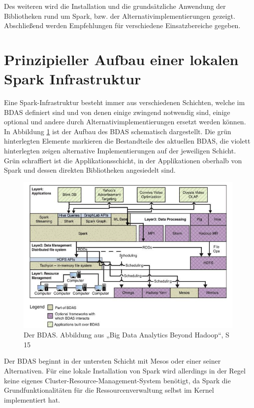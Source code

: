 Des weiteren wird die Installation und die grundsätzliche Anwendung der Bibliotheken rund um Spark, bzw. der Alternativimplementierungen gezeigt. Abschließend werden Empfehlungen für verschiedene Einsatzbereiche gegeben. 

\section{Prinzipieller Aufbau einer lokalen Spark Infrastruktur}
\label{section:prinzipiell}

Eine Spark-Infrastruktur besteht immer aus verschiedenen Schichten, welche im BDAS definiert sind und von denen einige zwingend notwendig sind, einige optional und andere durch Alternativimplementierungen ersetzt werden können.  
In Abbildung \ref{fig:bdas]} ist der Aufbau des BDAS schematisch dargestellt. Die grün hinterlegten Elemente markieren die Bestandteile des aktuellen BDAS, die violett hinterlegten zeigen alternative Implementierungen auf der jeweiligen Schicht. Grün schraffiert ist die Applikationsschicht, in der Applikationen oberhalb von Spark und dessen direkten Bibliotheken angesiedelt sind. 

\begin{figure}[htb!]
\centering
\includegraphics[width=1.0\textwidth]{bilder/2_2_stack.png}
\caption{Der BDAS. Abbildung aus „Big Data Analytics Beyond Hadoop“, S 15 \protect{}}
\label{fig:bdas]}
\end{figure} 

Der BDAS beginnt in der untersten Schicht mit Mesos oder einer seiner Alternativen. Für eine lokale Installation von Spark wird allerdings in der Regel keine eigenes Cluster-Resource-Management-System benötigt, da Spark die Grundfunktionalitäten für die Ressourcenverwaltung selbst im Kernel implementiert hat. 


